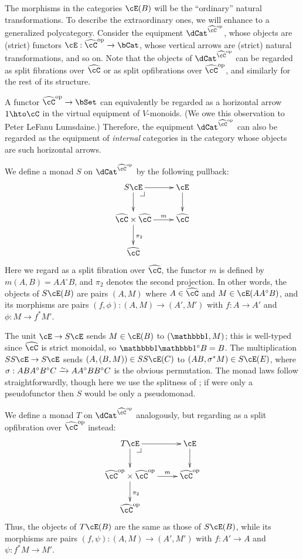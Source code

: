 \documentclass{amsart}
\newcommand{\C}{\cC}
\renewcommand{\Chat}{\ensuremath{\widehat{\C}}\xspace}
\newcommand{\E}{\cE}
\newcommand{\one}{\done}
\renewcommand{\o}{^{\circ}}
\begin{document}
The morphisms in the categories $\E(B)$ will be the ``ordinary'' natural transformations.
To describe the extraordinary ones, we will enhance \E to a generalized polycategory.
Consider the equipment $\dCat^{\Chat\op}$, whose objects are (strict) functors $\E:\Chat\op\to\bCat$, whose vertical arrows are (strict) natural transformations, and so on.
Note that the objects of $\dCat^{\Chat\op}$ can be regarded as split fibrations over $\Chat$ or as split opfibrations over $\Chat\op$, and similarly for the rest of its structure.

\begin{rmk}
  A functor $\Chat\op\to\bSet$ can equivalently be regarded as a horizontal arrow $1\hto \C$ in the virtual equipment of $V$-monoids.
  (We owe this observation to Peter LeFanu Lumsdaine.)
  Therefore, the equipment $\dCat^{\Chat\op}$ can also be regarded as the equipment of \emph{internal} categories in the category whose objects are such horizontal arrows.
\end{rmk}

We define a monad $S$ on $\dCat^{\Chat\op}$ by the following pullback:
\[ \xymatrix{ S \E \ar[r] \ar[d] \pullback & \E \ar[d] \\
  \Chat\times\Chat \ar[r]^-m \ar[d]^{\pi_2} & \Chat \\
  \Chat }\]
Here we regard \E as a split fibration over \Chat, the functor $m$ is defined by $m(A,B) = A A\o B$, and $\pi_2$ denotes the second projection.
In other words, the objects of $S\E(B)$ are pairs $(A,M)$ where $A\in\Chat$ and $M\in\E(A A\o B)$, and its morphisms are pairs $(f,\phi) : (A,M)\to (A',M')$ with $f:A\to A'$ and $\phi : M \to f^*M'$.

The unit $\E\to S\E$ sends $M\in \E(B)$ to $(\one,M)$; this is well-typed since $\Chat$ is strict monoidal, so $\one\one\o B = B$.
The multiplication $SS\E\to S\E$ sends $(A,(B,M)) \in S S \E(C)$ to $(AB,\sigma^* M)\in S\E(E)$, where $\sigma : ABA\o B\o C \toiso A A\o B B\o C$ is the obvious permutation.
The monad laws follow straightforwardly, though here we use the splitness of \E; if \E were only a pseudofunctor then $S$ would be only a pseudomonad.

We define a monad $T$ on $\dCat^{\Chat\op}$ analogously, but regarding \E as a split opfibration over $\Chat\op$ instead:
\[ \xymatrix{ T \E \ar[r] \ar[d] \pullback & \E \ar[d] \\
  \Chat\op\times\Chat\op \ar[r]^-m \ar[d]^{\pi_2} & \Chat\op \\
  \Chat\op }\]
Thus, the objects of $T\E(B)$ are the same as those of $S\E(B)$, while its morphisms are pairs $(f,\psi) : (A,M)\to (A',M')$ with $f:A'\to A$ and $\psi : f^* M \to M'$.
\end{document}
